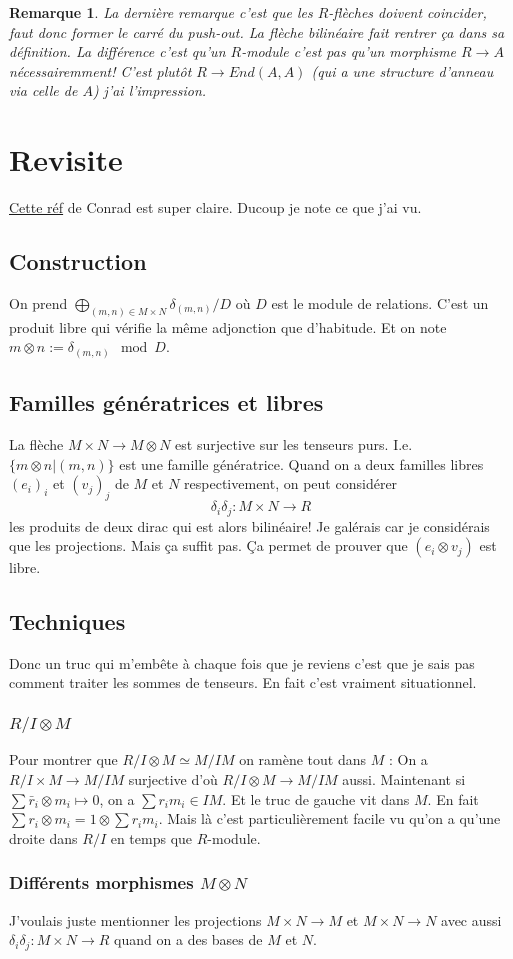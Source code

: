 \documentclass[a4paper,12pt]{book}
\theoremstyle{plain}
\newtheorem{rem}{Remarque}
\theoremstyle{definition}
\theoremstyle{remark}
\begin{document}
\begin{rem}
    La dernière remarque c'est que les $R$-flèches doivent
    coincider, faut donc former le carré du push-out. La flèche
    bilinéaire fait rentrer ça dans sa définition. La différence
    c'est qu'un $R$-module c'est pas qu'un morphisme $R\to A$ 
    nécessairemment! C'est plutôt $R\to End(A,A)$ (qui a une
    structure d'anneau via celle de $A$) j'ai
    l'impression.
\end{rem}

\chapter{Revisite}
\href{https://kconrad.math.uconn.edu/blurbs/linmultialg/tensorprod.pdf}{Cette réf}
de Conrad est super claire. Ducoup je note ce que j'ai vu.

\section{Construction}
On prend $\bigoplus_{(m,n)\in M\times N}\delta_{(m,n)}/D$ où
$D$ est le module de relations. C'est un produit libre qui vérifie
la même adjonction que d'habitude. Et on note 
$m\otimes n:=\delta_{(m,n)}\mod D$.

\section{Familles génératrices et libres}
La flèche $M\times N\to M\otimes N$ est surjective sur les tenseurs
purs. I.e. $\{m\otimes n|(m,n)\}$ est une famille génératrice.
Quand on a deux familles libres $(e_i)_i$ et $(v_j)_j$ de 
$M$ et $N$ respectivement, on peut considérer 
\[\delta_i\delta_j\colon M\times N\to R\]
les produits de deux dirac qui est alors bilinéaire! Je galérais
car je considérais que les projections. Mais ça suffit pas.
Ça permet de prouver que $(e_i\otimes v_j)$ est libre.

\section{Techniques}
Donc un truc qui m'embête à chaque fois que je reviens c'est que
je sais pas comment traiter les sommes de tenseurs. En fait 
c'est vraiment situationnel.
\subsection{$R/I\otimes M$}
Pour montrer que $R/I\otimes M\simeq M/IM$ on ramène tout
dans $M$ : On a $R/I\times M\to M/IM$ surjective d'où 
$R/I\otimes M\to M/IM$ aussi. Maintenant si 
$\sum \bar r_i\otimes m_i\mapsto 0$, on a $\sum r_im_i\in IM$.
Et le truc de gauche vit dans $M$. En fait $\sum r_i\otimes m_i
=1\otimes \sum r_im_i$. 
Mais là c'est particulièrement facile vu qu'on a qu'une droite
dans $R/I$ en temps que $R$-module.

\subsection{Différents morphismes $M\otimes N$}
J'voulais juste mentionner les projections $M\times N\to M$ et
$M\times N\to N$ avec aussi 
$\delta_i\delta_j\colon M\times N\to R$ quand on a des bases
de $M$ et $N$.
\end{document}
